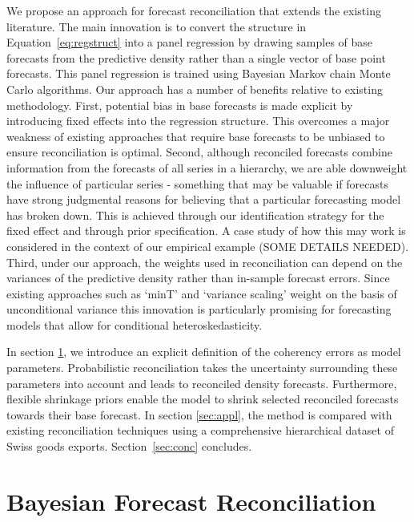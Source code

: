 \documentclass[a4paper,fleqn,11pt]{article}
\begin{document}
We propose an approach for forecast reconciliation that extends the existing literature.  The main innovation is to convert the structure in Equation~\ref{eq:regstruct} into a panel regression by drawing samples of base forecasts from the predictive density rather than a single vector of base point forecasts.  This panel regression is trained using Bayesian Markov chain Monte Carlo algorithms. Our approach has a number of benefits relative to existing methodology. First, potential bias in base forecasts is made explicit by introducing fixed effects into the regression structure.  This overcomes a major weakness of existing approaches that require base forecasts to be unbiased to ensure reconciliation is optimal.  Second, although reconciled forecasts combine information from the forecasts of all series in a hierarchy, we are able downweight the influence of particular series - something that may be valuable if forecasts have strong judgmental reasons for believing that a particular forecasting model has broken down.  This is achieved through our identification strategy for the fixed effect and through prior specification.  A case study of how this may work is considered in the context of our empirical example (SOME DETAILS NEEDED).  Third, under our approach, the weights used in reconciliation can depend on the variances of the predictive density rather than in-sample forecast errors.  Since existing approaches such as `minT' and `variance scaling' weight on the basis of unconditional variance this innovation is particularly promising for forecasting models that allow for conditional heteroskedasticity.  

In section \ref{sec:model}, we introduce an explicit definition of the coherency errors as model parameters. Probabilistic reconciliation takes the uncertainty surrounding these parameters into account and leads to reconciled density forecasts. Furthermore, flexible shrinkage priors enable the model to shrink selected reconciled forecasts towards their base forecast. In section \ref{sec:appl}, the method is compared with existing reconciliation techniques using a comprehensive hierarchical dataset of Swiss goods exports. Section~\ref{sec:conc} concludes.

\clearpage

\section{Bayesian Forecast Reconciliation}
\label{sec:model}
\end{document}
